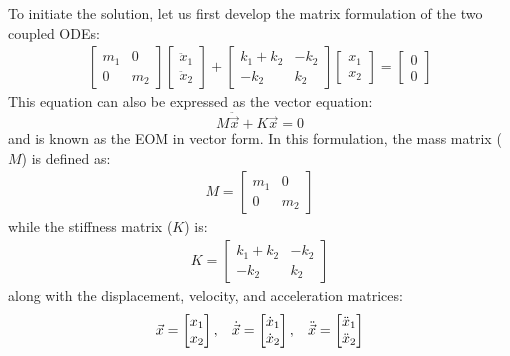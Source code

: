 \documentclass[12pt,letter]{article}
\begin{document}
	To initiate the solution, let us first develop the matrix formulation of the two coupled ODEs:
	\begin{eqnarray}
	  \begin{bmatrix} m_1 & 0  \\  0 & m_2 \end{bmatrix}\begin{bmatrix} \ddot{x}_1 \\  \ddot{x}_2 \end{bmatrix} + \begin{bmatrix} k_1+k_2 & -k_2  \\  -k_2 & k_2 \end{bmatrix}\begin{bmatrix} x_1 \\  x_2 \end{bmatrix} = \begin{bmatrix} 0 \\  0 \end{bmatrix}
	\end{eqnarray}
	This equation can also be expressed as the vector equation:
	\begin{equation}
	M\ddot{\vec{x}} + K\vec{x} =0
	\end{equation}
	and is known as the EOM in vector form. In this formulation, the mass matrix ($M$) is defined as:
	\begin{eqnarray}
	 M=  \begin{bmatrix} m_1 & 0  \\  0 & m_2 \end{bmatrix}  
	\end{eqnarray}
	while the stiffness matrix ($K$) is:
	\begin{eqnarray}
	 K=  \begin{bmatrix} k_1+k_2 & -k_2  \\  -k_2 & k_2 \end{bmatrix}
	\end{eqnarray}
	along with the displacement, velocity, and acceleration matrices:
	\begin{eqnarray}
	 \vec{x}=  \begin{bmatrix} x_1 \\  x_2 \end{bmatrix} , \hspace{2ex} \dot{\vec{x}}=  \begin{bmatrix} \dot{x}_1 \\  \dot{x}_2 \end{bmatrix}, \hspace{2ex} \ddot{\vec{x}}=  \begin{bmatrix} \ddot{x}_1 \\  \ddot{x}_2 \end{bmatrix}
	\end{eqnarray}
\end{document}
